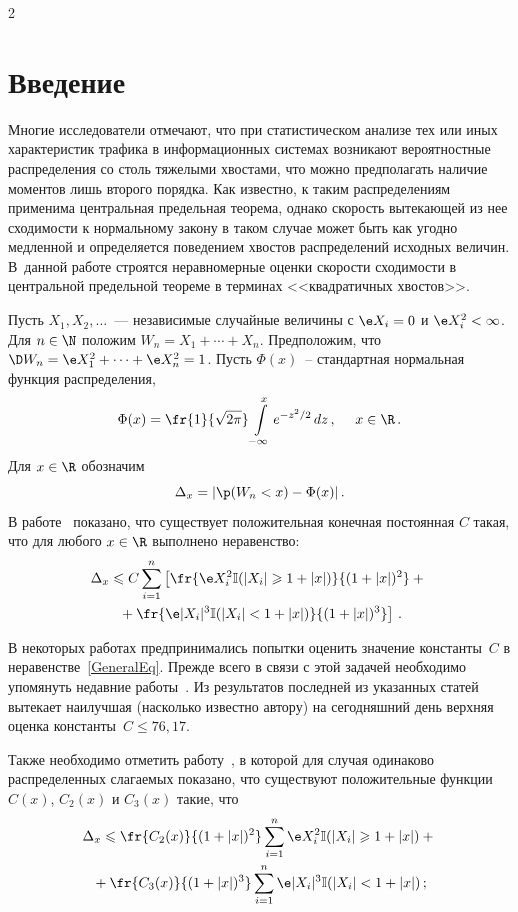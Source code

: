       \begin{multicols}{2}
      
            \label{st\stat}


\section{Введение}

Многие исследователи отмечают, что при статистическом анализе тех
или иных характеристик трафика в информационных системах возникают
вероятностные распределения со столь тяжелыми хвостами, что можно
предполагать наличие моментов лишь второго порядка. Как известно, к
таким распределениям применима центральная предельная теорема,
однако скорость вытекающей из нее сходимости к нормальному закону в
таком случае может быть как угодно медленной и определяется
поведением хвостов распределений исходных величин. В~данной работе
строятся неравномерные оценки скорости сходимости в центральной
предельной теореме в терминах <<квадратичных хвос\-тов>>.


Пусть $X_1,X_2,\ldots$~--- независимые случайные величины с $\e
X_i=0$ и $\e X_i^2<\infty$. Для $n\in\N$ положим
$W_n=X_1+\cdots+X_n.$ Предположим, что $\D W_n=\e X_1^2+\cdots+\e
X_n^2=1$. Пусть $\Phi(x)$~-- стандартная нормальная функция
распределения,
$$
\Phi(x)=\fr{1}{\sqrt{2\pi}}\int\limits_{-\infty}^{x}e^{-z^2/2}\,dz\,,\
\ \ \ x\in\R\,.
$$
Для $x\in\R$ обозначим
$$
\Delta_x=|\p(W_n<x)-\Phi(x)|\,.
$$
В работе~\cite{ChSh2001} показано, что существует положительная
конечная постоянная $C$ такая, что для любого $x\in\R$ выполнено
неравенство:
\begin{multline}
\label{GeneralEq}
\Delta_x\leqslant C\sum\limits_{i=1}^n\left[\fr{\e X_i^2\Iy(|X_i|\geqslant
1+|x|)}{(1+|x|)^2}+{}\right.\\
\left.{}+\fr{\e |X_i|^3\Iy(|X_i|<
1+|x|)}{(1+|x|)^3}\right]\,.
\end{multline}

В некоторых работах предпринимались попытки оценить значение
константы~$C$ в неравенстве~\eqref{GeneralEq}. Прежде всего в связи с этой
задачей необходимо упомянуть недавние работы~\cite{TN2007, NT2007}. 
Из результатов последней из указанных статей вытекает
наилучшая (насколько известно автору) на сегодняшний день верхняя
оценка константы~$C\leqslant 76{,}17$.

Также необходимо отметить работу~\cite{KP2011_Neam}, в которой для
случая одинаково распределенных слагаемых показано, что
существуют положительные функции $C(x)$, $C_2(x)$ и $C_3(x)$
такие, что
\begin{multline*}
\Delta_x\leqslant \fr{C_2(x)}{(1+|x|)^2}\sum\limits_{i=1}^n\e
X_i^2\Iy(|X_i|\geqslant 1+|x|)+{}\\
{}+\fr{C_3(x)}{(1+|x|)^3}\sum\limits_{i=1}^n\e
|X_i|^3\Iy(|X_i|< 1+|x|)\,;
\end{multline*}


\end{multicols}
